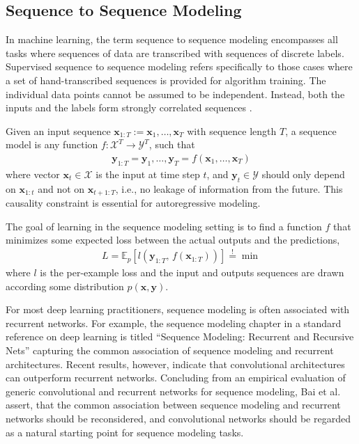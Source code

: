 \documentclass{scrartcl}
\begin{document}
\subsection{Sequence to Sequence Modeling}
In machine learning, the term sequence to sequence modeling encompasses all tasks where sequences of data are transcribed with sequences of discrete labels. Supervised sequence to sequence modeling refers specifically to those cases where a set of hand-transcribed sequences is provided for algorithm training. The individual data points cannot be assumed to be independent. Instead, both the inputs and the labels form strongly correlated sequences \cite{Graves2012}.

Given an input sequence $\mathbf x_{1:T} := \mathbf x_1, \dots, \mathbf x_T$ with sequence length $T$, a sequence model is any function $f: \mathcal X^T \rightarrow \mathcal Y^T$, such that
\begin{align}
\mathbf y_{1:T} = \mathbf y_1, \dots, \mathbf y_T = f(\mathbf x_1,\dots, \mathbf x_T)
\end{align}
where vector $\mathbf x_t \in \mathcal X$ is the input at time step $t$, and $\mathbf y_t \in \mathcal Y$ should only depend on $\mathbf x_{1:t}$ and not on $\mathbf x_{t+1:T}$, i.e., no leakage of information from the future. This causality constraint is essential for autoregressive modeling.  


The goal of learning in the sequence modeling setting is to find a function $f$ that minimizes some expected loss between the actual outputs and the predictions, 
\begin{align}
L = \mathbb E_p\left[l(\mathbf y_{1:T}, \, f(\mathbf x_{1:T}) )\right] \stackrel{\text{!}}{=} \min
\end{align}
where $l$ is the per-example loss and the input and outputs sequences are drawn according some distribution $p(\mathbf x,\mathbf y)$.

For most deep learning practitioners, sequence modeling is often associated with recurrent networks. For example, the sequence modeling chapter in a standard reference on deep learning is titled ``Sequence Modeling: Recurrent and Recursive Nets'' \cite{Goodfellow2016} capturing the common association of sequence modeling and recurrent architectures. Recent results, however, indicate that convolutional architectures can outperform recurrent networks. Concluding from an empirical evaluation of generic convolutional and recurrent networks for sequence modeling, Bai et al. \cite{Bai2018} assert, that the common association between sequence modeling and recurrent networks should be reconsidered, and convolutional networks should be regarded as a natural starting point for sequence modeling tasks.
\end{document}
